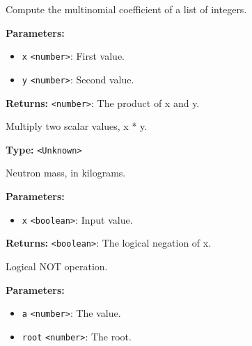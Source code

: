 \documentclass[12pt,a4paper]{article}
\begin{document}
\noindent Compute the multinomial coefficient of a list of integers.

\vspace{5mm}
\noindent {}


\noindent \textbf{Parameters:}
\begin{itemize}
  \item \texttt{x} \texttt{<number>}: First value.
  \item \texttt{y} \texttt{<number>}: Second value.
\end{itemize}

\noindent \textbf{Returns:} \texttt{<number>}: The product of x and y.

\noindent Multiply two scalar values, x * y.

\vspace{5mm}
\noindent {}\vspace{4mm}


\noindent \textbf{Type:} \texttt{<Unknown>}

\noindent Neutron mass, in kilograms.

\vspace{5mm}
\noindent {}


\noindent \textbf{Parameters:}
\begin{itemize}
  \item \texttt{x} \texttt{<boolean>}: Input value.
\end{itemize}

\noindent \textbf{Returns:} \texttt{<boolean>}: The logical negation of x.

\noindent Logical NOT operation.

\vspace{5mm}
\noindent {}


\noindent \textbf{Parameters:}
\begin{itemize}
  \item \texttt{a} \texttt{<number>}: The value.
  \item \texttt{root} \texttt{<number>}: The root.
\end{itemize}
\end{document}
